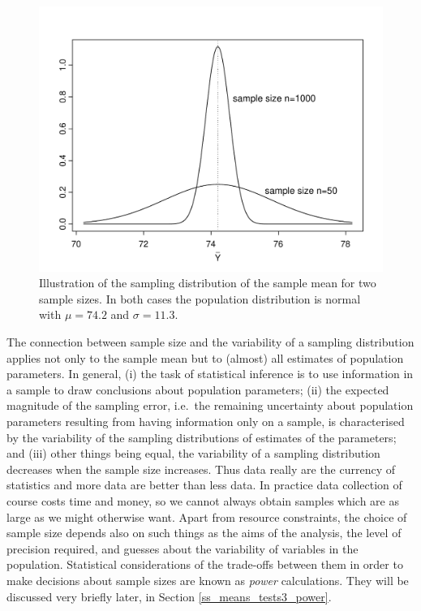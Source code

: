 \begin{figure}
\caption{Illustration of the sampling distribution of the sample mean
for two sample sizes. In both cases the population distribution is
normal with $\mu=74.2$ and $\sigma=11.3$.
}
\label{f_sampld2}

\begin{center}
\includegraphics[width=12cm]{sampld2_bp}
\end{center}

\end{figure}

The connection between sample size and the variability of a sampling
distribution applies not only to the sample mean but to (almost) all
estimates of population parameters. In general, (i) the task of
statistical inference is to use information in a sample to draw
conclusions about population parameters; (ii)
the expected magnitude of the sampling error, i.e.\
the remaining uncertainty about population parameters
resulting from having information only on a sample, is characterised by
the variability of the sampling distributions of estimates of the
parameters; and (iii) other things being equal, the variability of a
sampling distribution decreases when the sample size increases. Thus
data really are the currency of statistics and more data
are better than less data. In practice data collection of course costs
time and money, so we cannot always obtain samples which are as large as
we might otherwise want. Apart from resource constraints, the choice of
sample size depends also on such things as the aims of the
analysis, the level of precision required, and guesses about the
variability of variables in the population. Statistical
considerations of the trade-offs between them in order to make
decisions about sample sizes are known as
\emph{power} calculations. They will be discussed very briefly later, in
Section \ref{ss_means_tests3_power}.

